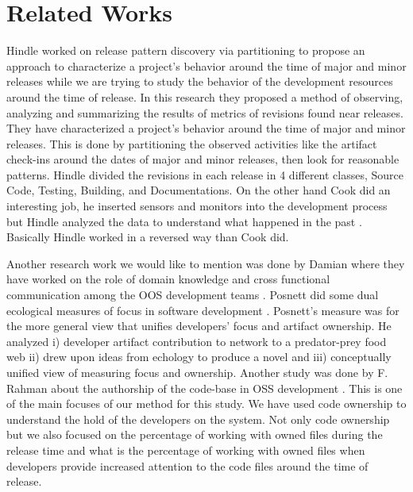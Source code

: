 \documentclass{acm_proc_article-sp}
\begin{document}
\section{Related Works}
Hindle worked on release pattern discovery via partitioning \cite{hindle_release_pattern} to propose an approach to characterize a project's behavior around the time of major and minor releases while we are trying to study the behavior of the development resources around the time of release. In this research they proposed a method of observing, analyzing and summarizing the results of metrics of revisions found near releases. They have characterized a project's behavior around the time of major and minor releases. This is done by partitioning the observed activities like the artifact check-ins around the dates of major and minor releases, then look for reasonable patterns. Hindle divided the revisions in each release in 4 different classes, Source Code, Testing, Building, and Documentations. On the other hand Cook did an interesting job, he inserted sensors and monitors into the development process but Hindle analyzed the data to understand what happened in the past \cite{cook_automating}. Basically Hindle worked in a reversed way than Cook did.

Another research work we would like to mention was done by  Damian where they have worked on the role of domain knowledge and cross functional communication among the OOS development teams \cite{damian_domain}. Posnett did some dual ecological measures of focus in software development \cite{posnett_ecological}. Posnett's measure was for the more general view that unifies developers' focus and artifact ownership. He analyzed i) developer artifact contribution to network to a predator-prey food web ii) drew upon ideas from echology to produce a novel and iii) conceptually unified view of measuring focus and ownership. Another study was done by F. Rahman about the authorship of the code-base in OSS development \cite{rahman_ownership}. This is one of the main focuses of our method for this study. We have used code ownership to understand the hold of the developers on the system. Not only code ownership but we also focused on the percentage of working with owned files during the release time and what is the percentage of working with owned files when developers provide increased attention to the code files around the time of release.
\end{document}
